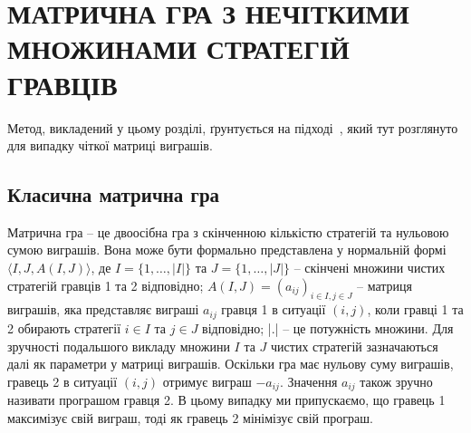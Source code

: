 \documentclass[14pt, a4paper, oneside]{extarticle}
\numberwithin{equation}{section}
\begin{document}
\section{МАТРИЧНА ГРА З НЕЧІТКИМИ МНОЖИНАМИ СТРАТЕГІЙ ГРАВЦІВ}
Метод, викладений у цьому розділі, ґрунтується на підході~\cite{MashchenkoValue}, який тут розглянуто для випадку чіткої матриці виграшів.


\subsection{Класична матрична гра}Матрична гра -- це двоосібна гра з скінченною кількістю стратегій та нульовою сумою виграшів. Вона може бути формально представлена у нормальній формі $\langle I, J, A(I, J)\rangle$, де $I=\{1, \ldots, |I|\}$ та $J=\{1, \ldots, |J|\}$ -- скінчені множини чистих стратегій гравців 1 та 2 відповідно; $A(I, J)=\left(a_{ij}\right)_{i \in I, j \in J}$ -- матриця виграшів, яка представляє виграші $a_{ij}$ гравця 1 в ситуації $(i, j)$, коли гравці 1 та 2 обирають стратегії $i \in I$ та $j \in J$ відповідно; |.| -- це потужність множини. Для зручності подальшого викладу множини $I$ та $J$ чистих стратегій зазначаються далі як параметри у матриці виграшів. Оскільки гра має нульову суму виграшів, гравець 2 в ситуації $(i, j)$ отримує виграш $-a_{ij}$. Значення $a_{ij}$ також зручно називати програшом гравця 2. В цьому випадку ми припускаємо, що гравець 1 максимізує свій виграш, тоді як гравець 2 мінімізує свій програш.
\end{document}
